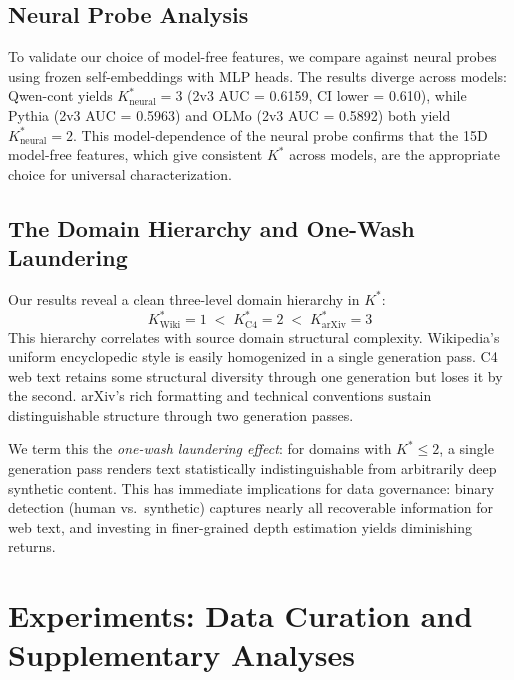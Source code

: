 \documentclass[11pt]{article}
\begin{document}
\subsection{Neural Probe Analysis}
\label{sec:neural-probe}

To validate our choice of model-free features, we compare against neural probes using frozen self-embeddings with MLP heads. The results diverge across models: Qwen-cont yields $K^*_\text{neural}{=}3$ (2v3 AUC = 0.6159, CI lower = 0.610), while Pythia (2v3 AUC = 0.5963) and OLMo (2v3 AUC = 0.5892) both yield $K^*_\text{neural}{=}2$. This model-dependence of the neural probe confirms that the 15D model-free features, which give consistent $K^*$ across models, are the appropriate choice for universal characterization.

\subsection{The Domain Hierarchy and One-Wash Laundering}

Our results reveal a clean three-level domain hierarchy in $K^*$:
\begin{equation}
    K^*_\text{Wiki} = 1 \;<\; K^*_\text{C4} = 2 \;<\; K^*_\text{arXiv} = 3
\end{equation}
This hierarchy correlates with source domain structural complexity. Wikipedia's uniform encyclopedic style is easily homogenized in a single generation pass. C4 web text retains some structural diversity through one generation but loses it by the second. arXiv's rich formatting and technical conventions sustain distinguishable structure through two generation passes.

We term this the \emph{one-wash laundering effect}: for domains with $K^* \le 2$, a single generation pass renders text statistically indistinguishable from arbitrarily deep synthetic content. This has immediate implications for data governance: binary detection (human vs.\ synthetic) captures nearly all recoverable information for web text, and investing in finer-grained depth estimation yields diminishing returns.

\section{Experiments: Data Curation and Supplementary Analyses}
\end{document}
